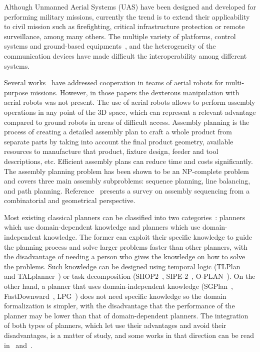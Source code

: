\documentclass[letterpaper, 12pt, conference]{ieeeconf}    %
\begin{document}


Although Unmanned Aerial Systems (UAS) have been designed and developed for performing military missions, currently the trend is to extend their applicability to civil mission such as firefighting, critical infrastructure protection or remote surveillance, among many others.  The multiple variety of platforms, control systems and ground-based equipments~\cite{perez_jint13,maza_jint10_multimodal}, and the heterogeneity of the communication devices have made difficult the interoperability among different systems. 

Several works~\cite{maza_icuas14,maza_jfr11_multiuav} have addressed cooperation in teams of aerial robots for multi-purpose missions. However, in those papers the dexterous manipulation with aerial robots was not present. The use of aerial robots allows to perform assembly operations in any point of the 3D space, which can represent a relevant advantage compared to ground robots in areas of difficult access. Assembly planning is the process of creating a detailed assembly plan to craft a whole product from separate parts by taking into account the final product geometry, available resources to manufacture that product, fixture design, feeder and tool descriptions, etc. Efficient assembly plans can reduce time and costs significantly. The assembly planning problem has been shown to be an NP-complete problem~\cite{Kavraki93} and covers three main assembly subproblems: sequence planning, line balancing, and path planning. Reference~\cite{Jimenez2011} presents a survey on assembly sequencing from a combinatorial and geometrical perspective.

Most existing classical planners can be classified into two categories~\cite{ingrand_ghallab_2013}: planners which use domain-dependent knowledge and planners which use domain-independent knowledge. The former can exploit their specific knowledge to guide the planning process and solve larger problems faster than other planners, with the disadvantage of needing a person who gives the knowledge on how to solve the problems. Such knowledge can be designed using temporal logic (TLPlan~\cite{Bacchus00usingtemporal} and TALplanner~\cite{Kvarnstrom01talplanner}) or task decomposition (SHOP2~\cite{Nau03shop2}, SIPE-2~\cite{Wilkins}, O-PLAN~\cite{Currie90}). On the other hand, a planner that uses domain-independent knowledge (SGPlan~\cite{Chen06}, FastDownward~\cite{Helmert06}, LPG~\cite{Gerevini01}) does not need specific knowledge so the domain formalization is simpler, with the disadvantage that the performance of the planner may be lower than that of domain-dependent planners. The integration of both types of planners, which let use their advantages and avoid their disadvantages, is a matter of study, and some works in that direction can be read in~\cite{Gerevini02} and~\cite{Shivashankar}.
\end{document}
